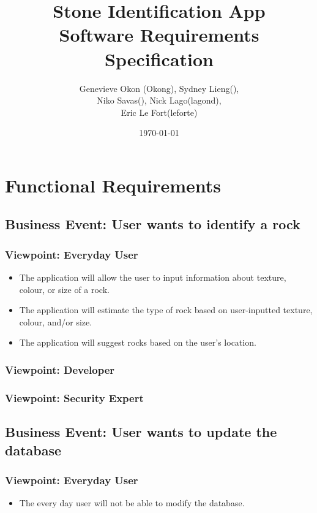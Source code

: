 \documentclass[titlepage]{article}
\begin{document}
\title{Stone Identification App \\
	Software Requirements Specification}
\author{Genevieve Okon (Okong), Sydney Lieng(),\\
	Niko Savas(), Nick Lago(lagond),\\
	Eric Le Fort(leforte)}
\date{\today}
\maketitle

\section{Functional Requirements}
\subsection {Business Event: User wants to identify a rock}
	\subsubsection {Viewpoint: Everyday User}
		\begin{itemize}
			\item The application will allow the user to input information about texture, colour, or size of a rock.
			\item The application will estimate the type of rock based on user-inputted texture, colour, and/or size.
			\item The application will suggest rocks based on the user's location.
		\end{itemize}
	\subsubsection {Viewpoint: Developer}
	\subsubsection {Viewpoint: Security Expert}
\subsection {Business Event: User wants to update the database}
	\subsubsection {Viewpoint: Everyday User}
		\begin{itemize}
			\item The every day user will not be able to modify the database.
		\end{itemize}
\end{document}
